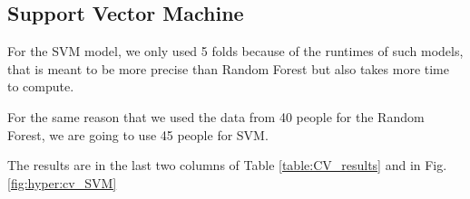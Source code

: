 \documentclass[conference]{IEEEtran}
\begin{document}
\subsection{Support Vector Machine}
\textcolor{baptiste}{For the SVM model, we only used 5 folds because of the runtimes of such models, that is meant to be more precise than Random Forest but also takes more time to compute.}

\textcolor{baptiste}{For the same reason that we used the data from 40 people for the Random Forest, we are going to use 45 people for SVM.
}

\textcolor{baptiste}{The results are in the last two columns of Table \ref{table:CV_results} and in Fig. \ref{fig:hyper:cv_SVM}}

\begin{figure}[ht!]
    \centering

    \quad
    \quad
    
    \quad
    \quad


\end{figure}
\end{document}
